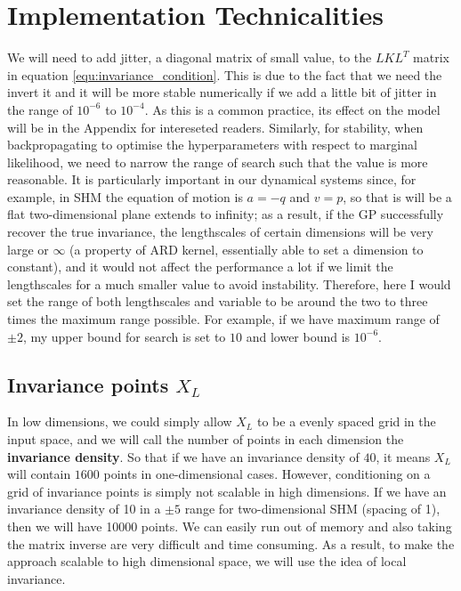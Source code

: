 \documentclass{statsmsc}
\begin{document}
\section{Implementation Technicalities}
We will need to add jitter, a diagonal matrix of small value, to the $LKL^T$ matrix in equation \ref{equ:invariance_condition}.
This is due to the fact that we need the invert it and it will be more stable numerically if we add a little bit of jitter in the range of $10^{-6}$ to $10^{-4}$.
As this is a common practice, its effect on the model will be in the Appendix for intereseted readers.
Similarly, for stability, when backpropagating to optimise the hyperparameters with respect to marginal likelihood, we need to narrow the range of search such that the value is more reasonable.
It is particularly important in our dynamical systems since, for example, in SHM the equation of motion is $a=-q$ and $v=p$, so that is will be a flat two-dimensional plane extends to infinity;
as a result, if the GP successfully recover the true invariance, the lengthscales of certain dimensions will be very large or $\infty$ (a property of ARD kernel, essentially able to set a dimension to constant), and it would not affect the performance a lot if we limit the lengthscales for a much smaller value to avoid instability.
Therefore, here I would set the range of both lengthscales and variable to be around the two to three times the maximum range possible.
For example, if we have maximum range of $\pm 2$, my upper bound for search is set to $10$ and lower bound is $10^{-6}$.

\subsection*{Invariance points $X_L$}
In low dimensions, we could simply allow $X_L$ to be a evenly spaced grid in the input space, and we will call the number of points in each dimension the \textbf{invariance density}.
So that if we have an invariance density of $40$, it means $X_L$ will contain $1600$ points in one-dimensional cases. 
However, conditioning on a grid of invariance points is simply not scalable in high dimensions. 
If we have an invariance density of 10 in a $\pm 5$ range for two-dimensional SHM (spacing of 1), then we will have 10000 points. 
We can easily run out of memory and also taking the matrix inverse are very difficult and time consuming.
As a result, to make the approach scalable to high dimensional space, we will use the idea of local invariance. 
\end{document}
